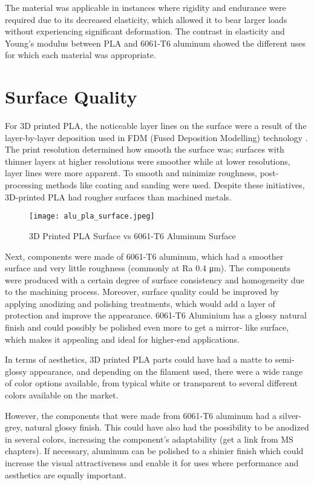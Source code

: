     The material was applicable in instances where rigidity and endurance were required due to its
    decreased elasticity, which allowed it to bear larger loads without experiencing significant deformation.
    The contrast in elasticity and Young's modulus between PLA and 6061-T6 aluminum showed the different uses for which each material was appropriate.
\section{Surface Quality}

    For 3D printed PLA, the noticeable layer lines on the surface were a result of the layer-by-layer
    deposition used in FDM (Fused Deposition Modelling) technology \cite{fusion_deposition_modeling}. The print resolution determined
    how smooth the surface was; surfaces with thinner layers at higher resolutions were smoother while at
    lower resolutions, layer lines were more apparent. To smooth and minimize roughness, post-processing
    methods like coating and sanding were used. Despite these initiatives, 3D-printed PLA had rougher
    surfaces than machined metals.

    \begin{figure}[H]
        \centering
        \texttt{[image: alu\_pla\_surface.jpeg]}
        \caption{3D Printed PLA Surface vs 6061-T6 Aluminum Surface}
        \label{fig:pla-surface}
    \end{figure}

    Next, components were made of 6061-T6 aluminum, which had a smoother surface and very little roughness
    (commonly at Ra 0.4 μm)\cite{T6_roughness_wiki}. The components were produced with a certain degree of surface consistency
    and homogeneity due to the machining process. Moreover, surface quality could be improved by applying
    anodizing and polishing treatments, which would add a layer of protection and improve the appearance.
    6061-T6 Aluminium has a glossy natural finish and could possibly be polished even more to get a mirror-
    like surface, which makes it appealing and ideal for higher-end applications.

    In terms of aesthetics, 3D printed PLA parts could have had a matte to semi-glossy appearance, and
    depending on the filament used, there were a wide range of color options available, from typical white
    or transparent to several different colors available on the market.

    However, the components that were made from 6061-T6 aluminum had a silver-grey, natural glossy
    finish. This could have also had the possibility to be anodized in several colors, increasing the
    component's adaptability (get a link from MS chapters). If necessary, aluminum can be polished to a
    shinier finish which could increase the visual attractiveness and enable it for uses where performance
    and aesthetics are equally important.

